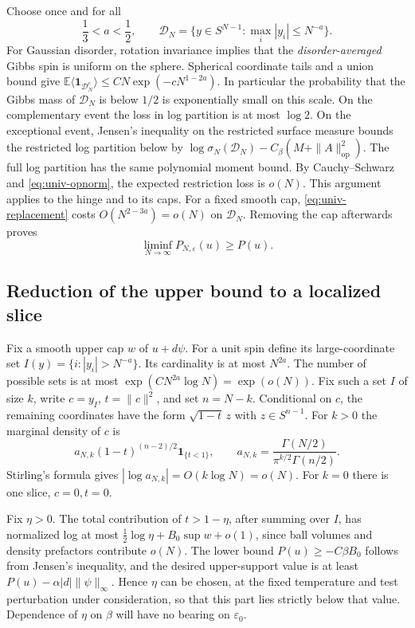 \documentclass[11pt,a4paper]{article}
\numberwithin{equation}{section}
\theoremstyle{definition}
\theoremstyle{remark}
\newcommand{\E}{\mathbb E}
\newcommand{\ind}{\mathbf 1}
\newcommand{\eps}{\varepsilon}
\begin{document}
Choose once and for all
\begin{equation}\label{eq:univ-a-range}
  \frac13<a<\frac12,\qquad
  \mathcal D_N=\{y\in S^{N-1}:\max_i|y_i|\le N^{-a}\}.
\end{equation}
For Gaussian disorder, rotation invariance implies that the
\emph{disorder-averaged} Gibbs spin is uniform on the sphere.  Spherical
coordinate tails and a union bound give
$\E\langle\ind_{\mathcal D_N^c}\rangle
\le CN\exp(-cN^{1-2a})$.  In particular the probability that the Gibbs
mass of $\mathcal D_N$ is below $1/2$ is exponentially small on this scale.
On the complementary event the loss in log partition is at most $\log2$.
On the exceptional event, Jensen's inequality on the restricted surface
measure bounds the restricted log partition below by
$\log\sigma_N(\mathcal D_N)-C_\beta(M+\|A\|_{\mathrm{op}}^2)$.
The full log partition has the same polynomial moment bound.  By
Cauchy--Schwarz and \eqref{eq:univ-opnorm}, the expected restriction loss
is $o(N)$.  This argument applies to the hinge and to its caps.
For a fixed smooth cap, \eqref{eq:univ-replacement} costs
$O(N^{2-3a})=o(N)$ on $\mathcal D_N$.  Removing the cap afterwards proves
\begin{equation}\label{eq:univ-lower}
 \liminf_{N\to\infty}P_{N,\eps}(u)\ge P(u).
\end{equation}

\subsection{Reduction of the upper bound to a localized slice}

Fix a smooth upper cap $w$ of $u+d\psi$.  For a unit spin define its
large-coordinate set
$I(y)=\{i:|y_i|>N^{-a}\}$.  Its cardinality is at most $N^{2a}$.
The number of possible sets is at most
$\exp(CN^{2a}\log N)=\exp(o(N))$.  Fix such a set $I$ of size $k$,
write $c=y_I$, $t=\|c\|^2$, and set $n=N-k$.  Conditional on $c$, the
remaining coordinates have the form $\sqrt{1-t}\,z$ with
$z\in S^{n-1}$.  For $k>0$ the marginal density of $c$ is
\[
 a_{N,k}(1-t)^{(n-2)/2}\ind_{\{t<1\}},\qquad
 a_{N,k}=\frac{\Gamma(N/2)}{\pi^{k/2}\Gamma(n/2)}.
\]
Stirling's formula gives $|\log a_{N,k}|=O(k\log N)=o(N)$.
For $k=0$ there is one slice, $c=0,t=0$.

Fix $\eta>0$.  The total contribution of $t>1-\eta$, after summing over
$I$, has normalized log at most
$\frac12\log\eta+B_0\sup w+o(1)$, since ball volumes and density
prefactors contribute $o(N)$.  The lower bound
$P(u)\ge- C\beta B_0$ follows from Jensen's inequality, and the desired
upper-support value is at least $P(u)-\alpha|d|\|\psi\|_\infty$.
Hence $\eta$ can be chosen, at the fixed temperature and test perturbation
under consideration, so that this part lies strictly below that value.  Dependence of $\eta$ on
$\beta$ will have no bearing on $\eps_0$.
\end{document}
